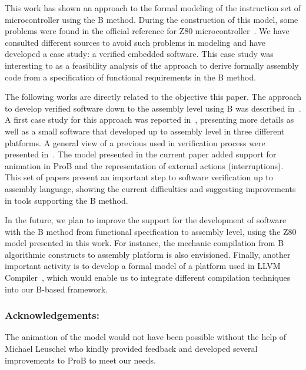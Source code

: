 \documentclass[a4paper]{llncs}
\begin{document}
This work has shown an approach to the formal modeling of the
instruction set of microcontroller using the B method.  During the
construction of this model, some problems were found in the official
reference for Z80 microcontroller~\cite{Z80_manual}. We have consulted
different sources \cite{Simulator_z80,UndocumentedZ80,Z80_manual} to
avoid such problems in modeling and have developed a case study: a
verified embedded software.  This case study was interesting to as a
feasibility analysis of the approach to derive formally assembly code
from a specification of functional requirements in the B method.




The following works are directly related to the objective this paper.
The approach to develop verified software down to the assembly level
using B was described in~\cite{DantasSemish2008}. A first case study
for this approach was reported in~\cite{Dantas_SBMF08}, presenting
more details as well as a small software that developed up to assembly
level in three different platforms. A general view of a previous used
in verification process were presented in~\cite{Valerio_SBMF09}. The
model presented in the current paper added support for animation in
ProB and the representation of external actions (interruptions).
This set of papers present an important step to software verification
up to assembly language, showing the current difficulties and
suggesting improvements in tools supporting the B method.


In the future, we plan to improve the support for the development of
software with the B method from functional specification to assembly
level, using the Z80 model presented in this work. For instance, the
mechanic compilation from B algorithmic constructs to assembly
platform is also envisioned. Finally, another important activity is to
develop a formal model of a platform used in LLVM
Compiler~\cite{DBLP:conf/cgo/LattnerA04}, which would enable us to
integrate different compilation techniques into our B-based framework.

\subsubsection{Acknowledgements:} The animation of the model would not
have been possible without the help of Michael Leuschel who kindly
provided feedback and developed several improvements to ProB to meet our
needs.
\end{document}
